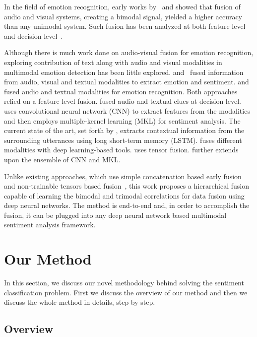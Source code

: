 \documentclass[review]{elsarticle}
\newcommand\?[1]{\hl{#1}}
\begin{document}
In the field of emotion recognition, early works by~\citet{de1997facial} and
\citet{chen1998multimodal} showed that fusion of audio and visual
systems, creating a bimodal signal, yielded a higher accuracy than any unimodal
system. Such fusion has been analyzed at both feature
level~\citep{kessous2010multimodal} and decision
level~\citep{schuller2011recognizing}.

Although there is much work done on audio-visual fusion for emotion recognition,
exploring contribution of text along with audio and visual modalities in
multimodal emotion detection has been little
explored. \citet{wollmer2013youtube} and~\citet{rozgic2012ensemble} fused
information from audio, visual and textual modalities to extract emotion and
sentiment. \citet{metallinou2008audio} and~\citet{eyben2010line} fused audio and
textual modalities for emotion recognition. Both approaches relied on a
feature-level fusion. \citet{wu2011emotion} fused audio and textual clues at
decision level. \citet{pordee} uses convolutional neural network (CNN) to
extract features from the modalities and then employs multiple-kernel learning
(MKL) for sentiment analysis. The current state of the art, set forth by
\citet{porcon}, extracts contextual information from the surrounding utterances
using long short-term memory (LSTM). \citet{porrev} fuses different
modalities with deep learning-based tools. \citet{zadten} uses tensor
fusion. \citet{porens} further extends upon the ensemble of CNN and MKL.

Unlike existing approaches, which use simple concatenation based early fusion~\citep{pordee,pordep} and non-trainable tensors based fusion~\citep{zadten}, this work proposes a hierarchical fusion capable of learning the bimodal and trimodal correlations for data fusion using deep neural networks. The method is end-to-end and, in order to accomplish the fusion, it can be plugged into any deep neural network based multimodal sentiment analysis framework. 

\section{Our Method}
\label{sec:model}

In this section, we discuss our novel methodology behind solving the sentiment
classification problem. First we discuss the overview of our method and then we
discuss the whole method in details, step by step.

\subsection{Overview}
\label{sec:overview}
\end{document}
